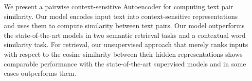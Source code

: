 We present a pairwise context-sensitive Autoencoder for computing text pair similarity. Our model encodes input text into context-sensitive representations and uses them to compute similarity between text pairs. Our model outperforms the state-of-the-art models in two semantic retrieval tasks and a contextual word similarity task. For retrieval, our unsupervised approach that merely ranks inputs with respect to the cosine similarity between their hidden representations shows comparable performance with the state-of-the-art supervised models and in some cases outperforms them.
